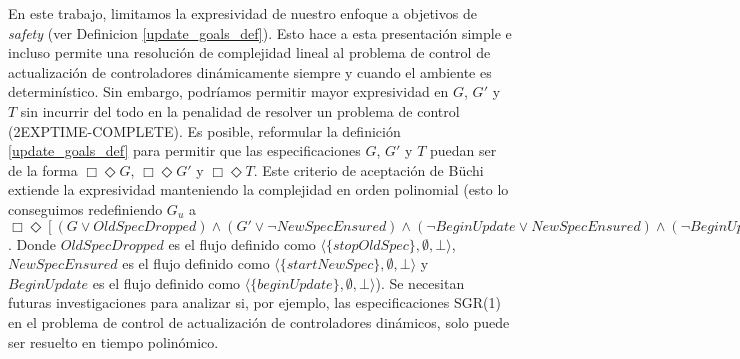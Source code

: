 En este trabajo, limitamos la expresividad de nuestro enfoque a objetivos de \emph{safety} (ver Definicion
\ref{update_goals_def}). Esto hace a esta presentación simple e incluso permite una resolución de complejidad lineal al
problema de control de actualización de controladores dinámicamente siempre y cuando el ambiente es determinístico. Sin
embargo, podríamos permitir mayor expresividad en $G$, $G'$ y $T$ sin incurrir del todo en la penalidad de resolver un
problema de control (2EXPTIME-COMPLETE). Es posible, reformular la definición \ref{update_goals_def} para permitir que
las especificaciones $G$, $G'$ y $T$ puedan ser de la forma $\Box \Diamond G$, $\Box \Diamond G'$ y $\Box \Diamond T$.
Este criterio de aceptación de Büchi extiende la expresividad manteniendo la complejidad en orden polinomial (esto lo
conseguimos redefiniendo $G_u$ a $\Box \Diamond [(G \lor OldSpecDropped) \wedge (G' \lor \neg NewSpecEnsured) \wedge
(\neg BeginUpdate \lor NewSpecEnsured) \wedge (\neg BeginUpdate \lor  OldSpecDropped) \wedge  T]$. Donde
$OldSpecDropped$ es el flujo definido como $\langle \{stopOldSpec\},\emptyset,\bot\rangle$, $NewSpecEnsured$ es el flujo
definido como $\langle \{startNewSpec\},\emptyset,\bot\rangle$ y $BeginUpdate$ es el flujo definido como $\langle
\{beginUpdate\},\emptyset,\bot\rangle$). Se necesitan futuras investigaciones para analizar si, por ejemplo, las
especificaciones SGR(1) \cite{D'ippolito:2013:SNE:2430536.2430543} en el problema de control de actualización de
controladores dinámicos, solo puede ser resuelto en tiempo polinómico.

